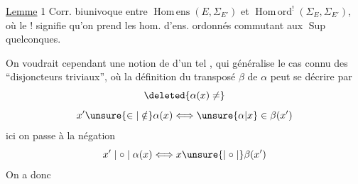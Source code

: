\uline{Lemme} 1 Corr. biunivoque entre   $\operatorname{Hom\,ens}(E,\Sigma_{E'})$ et $\operatorname{Hom\,ord}^{!}(\Sigma_E,\Sigma_{E'})$, où le $!$ signifie qu'on prend les hom. d'ens. ordonnés commutant aux $\operatorname{Sup}$ quelconques.

On voudrait cependant une notion de  d'un tel , qui généralise le cas connu des ``disjoncteurs triviaux'', où la définition du transposé $\beta$ de $\alpha$ peut se décrire par
\[
\deleted{\alpha(x)\ne}
\]
\[
x'\unsure{\in|\notin}\alpha(x)\Longleftrightarrow\unsure{\alpha|x}\in\beta(x')
\]
ici on passe à la négation
\[
x'\mid\circ\mid\alpha(x)\Longleftrightarrow x\unsure{\mid\circ\mid}\beta(x')
\]
On a donc


